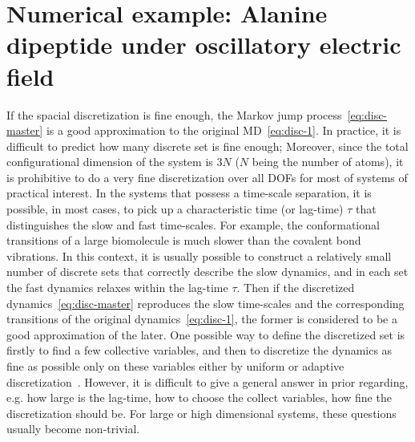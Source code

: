 \documentclass[aps, pre, preprint,unsortedaddress,a4paper,onecolumn]{revtex4}
\begin{document}
\section{Numerical example:
  Alanine dipeptide under oscillatory electric field}
\label{sec:alanine}

If the spacial discretization is fine enough, the Markov jump
process~\eqref{eq:disc-master} is a good approximation to the original
MD~\eqref{eq:disc-1}.  In practice, it is difficult to predict
how many discrete set is fine enough; Moreover, since the
total configurational dimension of the system is $3N$ ($N$ being the
number of atoms), it is prohibitive to do a very fine discretization
over all DOFs for most of systems of practical interest.
In the systems that possess a
time-scale separation, it is possible, in most cases, to pick up
a characteristic time (or lag-time) $\tau$ that distinguishes the slow
and fast time-scales.
For example, the conformational
transitions of a large biomolecule is much slower than the covalent bond
vibrations. 
In this context,
it is usually possible to construct a
relatively small number of discrete sets that
correctly describe the slow  dynamics, and 
in each set the fast dynamics relaxes within the lag-time $\tau$.
Then if the discretized dynamics~\eqref{eq:disc-master}
reproduces the slow time-scales and the corresponding transitions
of the original dynamics~\eqref{eq:disc-1},
the former is considered to be a good approximation of the later.
One possible way to define the discretized set is firstly to find a few collective
variables, and then to discretize the dynamics as fine as possible only on these
variables either by uniform or adaptive
discretization~\cite{chodera2007automatic, prinz2011markov}.
However, it is difficult to give a general answer in prior regarding, e.g.
how large is the lag-time,
how to choose the collect variables, how fine the discretization should be.
For large or high dimensional systems, these questions usually become non-trivial. 
\end{document}
